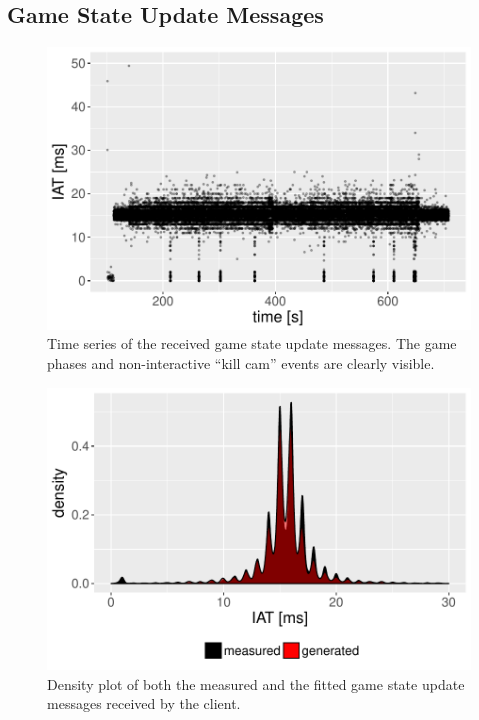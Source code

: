 




\subsection{Game State Update Messages}

	\begin{figure}[t]
		\centering
		\includegraphics[width=1.0\columnwidth]{images/update-ts.pdf}
		\caption{Time series of the received game state update messages. The game phases and non-interactive ``kill cam'' events are clearly visible.}
	\label{fig:update-timeseries}
	\end{figure}

	\begin{figure}[t]
		\centering
		\includegraphics[width=1.0\columnwidth]{images/update-density.pdf}
		\caption{Density plot of both the measured and the fitted game state update messages received by the client.}
	\label{fig:update-density}
	\end{figure}

